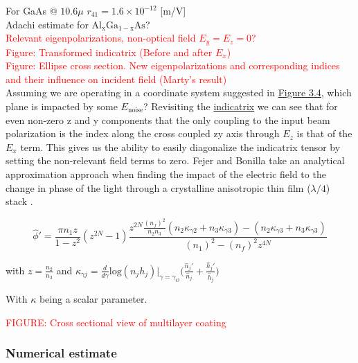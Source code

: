 For GaAs @ $10.6\mu$ $r_{41} = 1.6 \times 10^{-12}$ [m/V]
\\
Adachi estimate for $\mathrm{Al_{x}Ga_{1-x}As}$?
\\
\textcolor{red}{Relevant eigenpolarizations, non-optical field $E_y = E_z = 0$?}
\\
\textcolor{red}{Figure: Transformed indicatrix (Before and after $E_x$)}
\\
\textcolor{red}{Figure: Ellipse cross section. New eigenpolarizations and corresponding indices and their influence on incident field (Marty's result)}
\\
Assuming we are operating in a coordinate system suggested in \hyperref[fig:algaas_coords]{Figure 3.4}, which plane is impacted by some $E_\mathrm{noise}$? Revisiting the \hyperref[eq:zindicatrix]{indicatrix} we can see that for even non-zero z and y components that the only coupling to the input beam polarization is the index along the cross coupled zy axis through $E_z$ is that of the $E_x$ term. This gives us the ability to easily diagonalize the indicatrix tensor by setting the non-relevant field terms to zero.
Fejer and Bonilla take an analytical approximation approach when finding the impact of the electric field to the change in phase of the light through a crystalline anisotropic thin film ($\lambda/4$) stack \cite{bonilla_fejer}.

\begin{equation}
\hat{\phi}' = \frac{\pi n_1 z}{1-z^2}(z^{2N} -1) \frac{z^{2N} \frac{(n_f)^2}{n_2 n_3}(n_2 \kappa_{\gamma 2} + n_3\kappa_{\gamma 3}) - (n_2 \kappa_{\gamma 3} + n_3\kappa_{\gamma 3})}{(n_1)^2 -(n_f)^2 z^{4N}}
\end{equation}

with $z = \frac{n_2}{n_3}$
and
$
\kappa_{\gamma j} = \frac{d}{d \gamma} \mathrm{log}(n_j h_j)|_{\gamma =\gamma_{O}} \bigg(\frac{\hat{n}_j'}{\hat{n}_j} +\frac{\hat{h}_j'}{\hat{h}_j} \bigg)
$

With $\kappa$ being a scalar parameter.

\textcolor{red}{FIGURE: Cross sectional view of multilayer coating}

\subsubsection{Numerical estimate}


